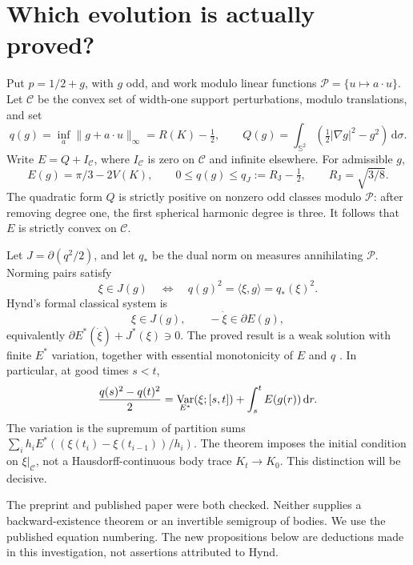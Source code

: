 \documentclass[11pt]{article}
\theoremstyle{remark}\newtheorem{remark}[theorem]{Remark}
\newcommand{\Sph}{\mathbb S^2}
\newcommand{\RJ}{R_{\mathrm J}}
\newcommand{\dd}{\,\mathrm d}
\newcommand{\C}{\mathcal C}
\newcommand{\Pp}{\mathcal P}
\begin{document}
\section{Which evolution is actually proved?}
Put $p=1/2+g$, with $g$ odd, and work modulo linear functions
$\Pp=\{u\mapsto a\cdot u\}$. Let $\C$ be the convex set of width-one support perturbations, modulo translations, and set
\[
 q(g)=\inf_a\|g+a\cdot u\|_\infty=R(K)-\tfrac12,
 \qquad Q(g)=\int_{\Sph}\left(\tfrac12|\nabla g|^2-g^2\right)\dd\sigma.
\]
Write $E=Q+I_{\C}$, where $I_{\C}$ is zero on $\C$ and infinite elsewhere. For admissible $g$,
\begin{equation}\label{flow:volume}
 E(g)=\pi/3-2V(K),\qquad 0\leq q(g)\leq q_J:=\RJ-\tfrac12,
 \qquad \RJ=\sqrt{3/8}.
\end{equation}
The quadratic form $Q$ is strictly positive on nonzero odd classes modulo $\Pp$: after removing degree one, the first spherical harmonic degree is three. It follows that $E$ is strictly convex on $\C$.

Let $J=\partial(q^2/2)$, and let $q_*$ be the dual norm on measures annihilating $\Pp$. Norming pairs satisfy
\begin{equation}\label{flow:normpair}
 \xi\in J(g)\quad\Longleftrightarrow\quad
 q(g)^2=\langle\xi,g\rangle=q_*(\xi)^2.
\end{equation}
Hynd's formal classical system is
\begin{equation}\label{flow:classical}
 \xi\in J(g),\qquad -\dot\xi\in\partial E(g),
\end{equation}
equivalently $\partial E^*(\dot\xi)+J^*(\xi)\ni0$. The proved result is a weak solution with finite $E^*$ variation, together with essential monotonicity of $E$ and $q$ \cite[Definition 4.1, Theorem 4.3, Corollary 4.5]{HyndFlow}. In particular, at good times $s<t$,
\begin{equation}\label{flow:weak}
 \frac{q(s)^2-q(t)^2}{2}
 =\mathop{\rm Var}_{E^*}(\xi;[s,t])+\int_s^t E(g(r))\dd r.
\end{equation}
The variation is the supremum of partition sums
$\sum_i h_i E^*((\xi(t_i)-\xi(t_{i-1}))/h_i)$.
The theorem imposes the initial condition on $\xi|_{\C}$, not a Hausdorff-continuous body trace $K_t\to K_0$. This distinction will be decisive.

The preprint and published paper were both checked. Neither supplies a backward-existence theorem or an invertible semigroup of bodies. We use the published equation numbering. The new propositions below are deductions made in this investigation, not assertions attributed to Hynd.
\end{document}

